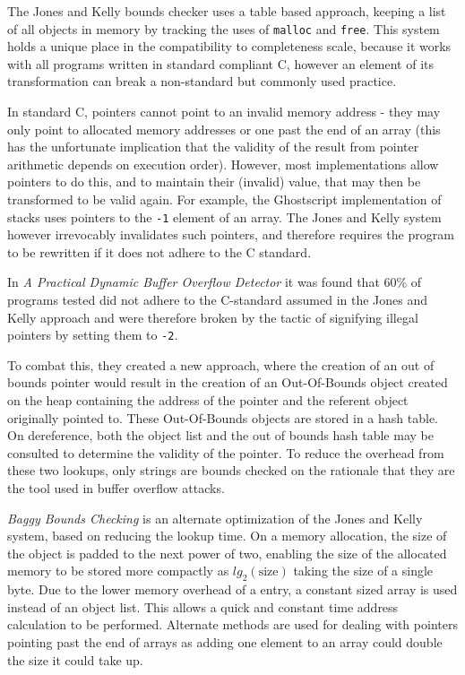 The Jones and Kelly bounds checker \cite{jones1997backwards} uses a table based approach, keeping a list of all objects in memory by tracking the uses of \verb!malloc! and \verb!free!.
This system holds a unique place in the compatibility to completeness scale, because it works with all programs written in standard compliant C, however an element of its transformation can break a non-standard but commonly used practice.

In standard C, pointers cannot point to an invalid memory address - they may only point to allocated memory addresses or one past the end of an array (this has the unfortunate implication that the validity of the result from pointer arithmetic depends on execution order).
However, most implementations allow pointers to do this, and to maintain their (invalid) value, that may then be transformed to be valid again.
For example, the Ghostscript implementation of stacks uses pointers to the \verb!-1! element of an array.
The Jones and Kelly system however irrevocably invalidates such pointers, and therefore requires the program to be rewritten if it does not adhere to the C standard.

In \textit{A Practical Dynamic Buffer Overflow Detector} \cite{ruwase2004practical} it was found that 60\% of programs tested did not adhere to the C-standard assumed in the Jones and Kelly approach and were therefore broken by the tactic of signifying illegal pointers by setting them to \verb!-2!.

To combat this, they created a new approach, where the creation of an out of bounds pointer would result in the creation of an Out-Of-Bounds object created on the heap containing the address of the pointer and the referent object originally pointed to.
These Out-Of-Bounds objects are stored in a hash table.
On dereference, both the object list and the out of bounds hash table may be consulted to determine the validity of the pointer.
To reduce the overhead from these two lookups, only strings are bounds checked on the rationale that they are the tool used in buffer overflow attacks.

\textit{Baggy Bounds Checking} \cite{akritidis2009baggy} is an alternate optimization of the Jones and Kelly system, based on reducing the lookup time.
On a memory allocation, the size of the object is padded to the next power of two, enabling the size of the allocated memory to be stored more compactly as $lg_2(\mbox{size})$ taking the size of a single byte.
Due to the lower memory overhead of a entry, a constant sized array is used instead of an object list.
This allows a quick and constant time address calculation to be performed.
Alternate methods are used for dealing with pointers pointing past the end of arrays as adding one element to an array could double the size it could take up.

